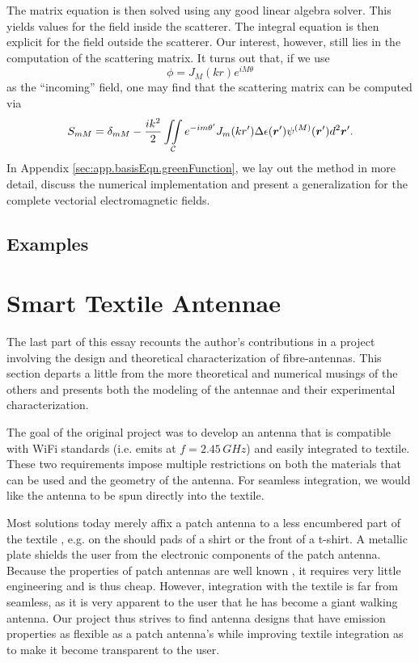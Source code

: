 The matrix equation is then solved using any good 
linear algebra solver. This yields values for the
field inside the scatterer. The integral equation
is then explicit for the field outside the scatterer. 
Our interest, however, still lies in the computation
of the scattering matrix. It turns out that, if we
use 
	\begin{equation}
		\phi = J_M(kr)e^{iM\theta}
	\end{equation}
as the ``incoming'' field, one may find that the scattering
matrix can be computed via
	\begin{equation}
		S_{mM} = \delta_{mM} - \frac{ik^2}{2}\mathop{\iint}_\mathcal{C}e^{-im{\theta'}}J_m(kr')\Delta\epsilon(\boldsymbol{r}')\psi^{(M)}(\boldsymbol{r}')d^2\boldsymbol{r}'.
	\end{equation}
In Appendix \ref{sec:app.basisEqn.greenFunction}, we lay out the method in more detail, 
discuss the numerical implementation and present a generalization for the complete 
vectorial electromagnetic fields.

\subsection{Examples}

\section{Smart Textile Antennae}
The last part of this essay recounts the author's contributions
in a project involving the design and theoretical characterization
of fibre-antennas. This section departs a little from the more theoretical
and numerical musings of the others and presents both the modeling of the 
antennae and their experimental characterization.   

The goal of the original project was to develop an antenna that is compatible with 
WiFi standards (i.e. emits at $f=2.45\,\unit{GHz}$) and easily integrated
to textile. These two requirements impose multiple restrictions on both
the materials that can be used and the geometry of the antenna. For seamless
integration, we would like the antenna to be spun directly into the textile. 

Most solutions today merely affix a patch antenna to a less 
encumbered part of the textile \cite{CAT2004,JAI2013}, e.g. 
on the should pads of a shirt or the front of a t-shirt.
A metallic plate shields the user from the electronic components 
of the patch antenna. Because the properties of patch antennas are
well known \cite{ELL2003}, it requires very little engineering and is thus cheap. However, integration 
with the textile is far from seamless, as it is very apparent to the
user that he has become a giant walking antenna. Our project thus 
strives to find antenna designs that have emission properties
as flexible as a patch antenna's while improving textile integration
as to make it become transparent to the user.

